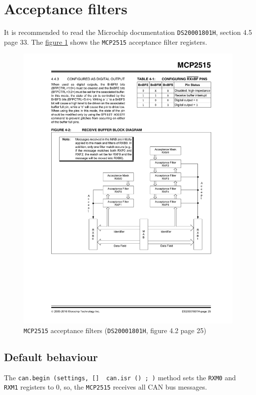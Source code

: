 \documentclass[10pt, a4paper, obeyspaces, openany]{extarticle}
\newcommand \sectionLabel[2]{\section{#1}\label{sec:#2}}
\newcommand\labelFigure[1]{\label{fig:#1}}
\newcommand\refFigure[2]{\hyperref[fig:#2]{figure \ref*{fig:#2}{\ifthenelse{\equal{#1}{}}{}{.#1}}}}
\begin{document}
\sectionLabel{Acceptance filters}{acceptanceFilters}

It is recommended to read the Microchip documentation \texttt{DS20001801H}, section 4.5 page 33. The \refFigure{}{figureFiltres2515} shows the \texttt{MCP2515} acceptance filter registers.



\begin{figure}[!ht]
  \small
  \centering
  \includegraphics[width=12cm]{mcp2515-filters.pdf}
  \caption{\texttt{MCP2515} acceptance filters (\texttt{DS20001801H}, figure 4.2 page 25)}
  \labelFigure{figureFiltres2515}
\end{figure}








\subsection{Default behaviour}

The \texttt{can.begin (settings, [] { can.isr () ; })} method sets the \texttt{RXM0} and \texttt{RXM1} registers to $0$, so, the \texttt{MCP2515} receives all CAN bus messages.
\end{document}
